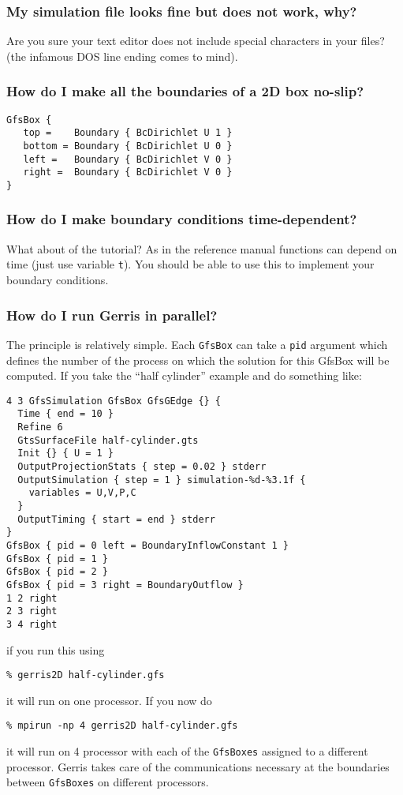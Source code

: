 \documentclass[a4paper]{article}
\begin{document}
\subsubsection{My simulation file looks fine but does not work, why?}

Are you sure your text editor does not
include special characters in your files? (the infamous DOS line ending
comes to mind).

\subsubsection{How do I make all the boundaries of a 2D box no-slip?}

\begin{verbatim}
GfsBox {
   top =    Boundary { BcDirichlet U 1 }
   bottom = Boundary { BcDirichlet U 0 }
   left =   Boundary { BcDirichlet V 0 }
   right =  Boundary { BcDirichlet V 0 }
}
\end{verbatim}

\subsubsection{How do I make boundary conditions time-dependent?}

What about  of the tutorial?
As  in the reference manual
functions can depend on time (just use variable {\tt t}). You should
be able to use this to implement your boundary conditions.

\subsubsection{How do I run Gerris in parallel?}

The principle is relatively simple. Each {\tt GfsBox} can take a {\tt pid}
argument which defines the number of the process on which the solution
for this GfsBox will be computed. If you take the ``half cylinder''
example and do something like:
\begin{verbatim}
4 3 GfsSimulation GfsBox GfsGEdge {} {
  Time { end = 10 }
  Refine 6
  GtsSurfaceFile half-cylinder.gts
  Init {} { U = 1 }
  OutputProjectionStats { step = 0.02 } stderr
  OutputSimulation { step = 1 } simulation-%d-%3.1f {
    variables = U,V,P,C
  }
  OutputTiming { start = end } stderr
}
GfsBox { pid = 0 left = BoundaryInflowConstant 1 }
GfsBox { pid = 1 }
GfsBox { pid = 2 }
GfsBox { pid = 3 right = BoundaryOutflow }
1 2 right
2 3 right
3 4 right
\end{verbatim}
if you run this using
\begin{verbatim}
% gerris2D half-cylinder.gfs
\end{verbatim}
it will run on one processor. If you now do
\begin{verbatim}
% mpirun -np 4 gerris2D half-cylinder.gfs
\end{verbatim}
it will run on 4 processor with each of the {\tt GfsBoxes} assigned to a
different processor. Gerris takes care of the communications necessary
at the boundaries between {\tt GfsBoxes} on different processors.
\end{document}
